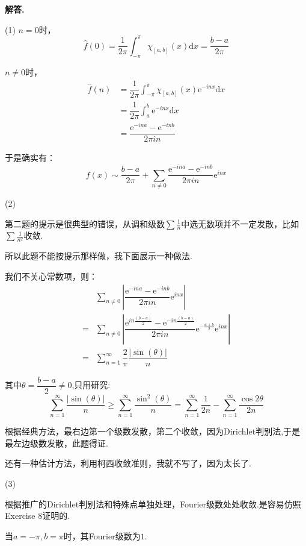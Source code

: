 \documentclass[12pt, a4paper, oneside]{ctexart}
\newenvironment{solution}{\par\noindent\textbf{解答. }}{\par}
\begin{document}
\begin{solution}
\par
(1)
$n=0$时，
$$
\hat{f}(0)=\dfrac{1}{2\pi}\int_{-\pi}^{\pi}\chi_{[a,b]}(x)\mathrm{d}x=\dfrac{b-a}{2\pi}
$$
\par
$n\neq 0$时，
$$
\begin{aligned}
\hat{f}(n)&=\dfrac{1}{2\pi}\int_{-\pi}^{\pi}\chi_{[a,b]}(x)\mathrm{e}^{-inx}\mathrm{d}x\\
&=\dfrac{1}{2\pi}\int_{a}^{b}\mathrm{e}^{-inx}\mathrm{d}x\\
&=\dfrac{\mathrm{e}^{-ina}-\mathrm{e}^{-inb}}{2\pi i n}
\end{aligned}
$$
\par
于是确实有：
$$
f(x)\sim \dfrac{b-a}{2\pi}+\sum_{n \neq 0}\dfrac{\mathrm{e}^{-ina}-\mathrm{e}^{-inb}}{2\pi i n}\mathrm{e}^{inx}
$$
\par
(2)
\par
第二题的提示是很典型的错误，从调和级数$\sum\frac{1}{n}$中选无数项并不一定发散，比如
$\sum \frac{1}{n^2}$收敛.
\par
所以此题不能按提示那样做，我下面展示一种做法.
\par
我们不关心常数项，则：
$$
\begin{aligned}
&\sum_{n\neq 0}\left|\dfrac{\mathrm{e}^{-ina}-\mathrm{e}^{-inb}}{2\pi in}\mathrm{e}^{inx}
\right|\\
=&\sum_{n\neq 0}\left|\dfrac{\mathrm{e}^{in\frac{(b-a)}{2}}
-\mathrm{e}^{-in\frac{(b-a)}{2}}}{2\pi in}\mathrm{e}^{-\frac{a+b}{2}}\mathrm{e}^{inx}\right|\\
=&\sum_{n=1}^{\infty}\dfrac{2}{\pi}\dfrac{|\sin (\theta)|}{n}
\end{aligned}
$$
\par
其中$\theta=\dfrac{b-a}{2}\neq 0$,只用研究:
$$
\sum_{n=1}^{\infty}\dfrac{|\sin (\theta)|}{n}\geqslant \sum_{n=1}^{\infty}\dfrac{\sin^2(\theta)}{n}=
\sum_{n=1}^{\infty}\dfrac{1}{2n}-\sum_{n=1}^{\infty}\dfrac{\cos 2\theta}{2n}
$$
\par
根据经典方法，最右边第一个级数发散，第二个收敛，因为Dirichlet判别法,于是最左边级数发散，此题得证.
\par
还有一种估计方法，利用柯西收敛准则，我就不写了，因为太长了.
\par
(3)
\par
根据推广的Dirichlet判别法和特殊点单独处理，Fourier级数处处收敛.是容易仿照Exercise 8证明的.
\par
当$a=-\pi,b=\pi$时，其Fourier级数为$1$.


\end{solution}
\end{document}

